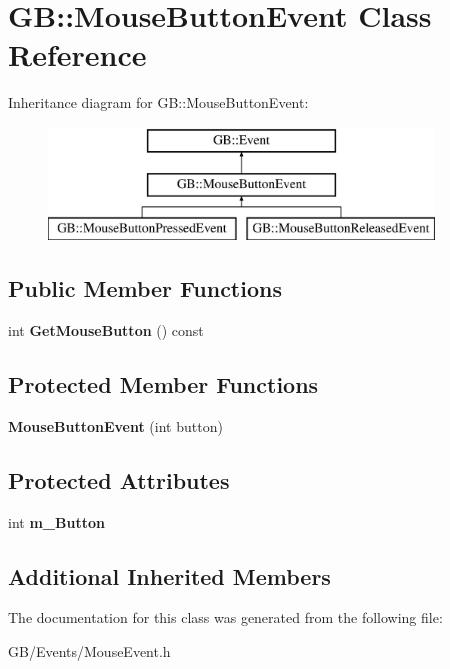 \hypertarget{class_g_b_1_1_mouse_button_event}{}\section{GB\+::Mouse\+Button\+Event Class Reference}
\label{class_g_b_1_1_mouse_button_event}
Inheritance diagram for GB\+::Mouse\+Button\+Event\+:\begin{figure}[H]
\begin{center}
\leavevmode
\includegraphics[height=3.000000cm]{class_g_b_1_1_mouse_button_event}
\end{center}
\end{figure}
\subsection*{Public Member Functions}
\begin{DoxyCompactItemize}
\item 
\mbox{\label{class_g_b_1_1_mouse_button_event_a21e131baff6096b49d5ea663ca739c4f}} 
int {\bfseries Get\+Mouse\+Button} () const
\end{DoxyCompactItemize}
\subsection*{Protected Member Functions}
\begin{DoxyCompactItemize}
\item 
\mbox{\label{class_g_b_1_1_mouse_button_event_ac3e77ddf5017087368887a183f235d98}} 
{\bfseries Mouse\+Button\+Event} (int button)
\end{DoxyCompactItemize}
\subsection*{Protected Attributes}
\begin{DoxyCompactItemize}
\item 
\mbox{\label{class_g_b_1_1_mouse_button_event_a34c02a1b7efdd170af911b121152cd3f}} 
int {\bfseries m\+\_\+\+Button}
\end{DoxyCompactItemize}
\subsection*{Additional Inherited Members}


The documentation for this class was generated from the following file\+:\begin{DoxyCompactItemize}
\item 
G\+B/\+Events/Mouse\+Event.\+h\end{DoxyCompactItemize}
